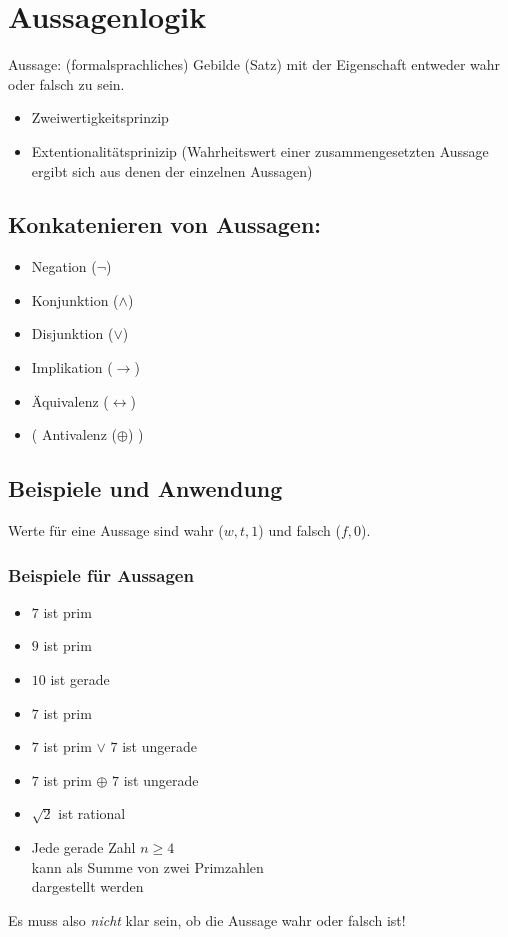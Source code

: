 %
\section{Aussagenlogik}
Aussage: (formalsprachliches) Gebilde (Satz) mit der Eigenschaft entweder wahr oder falsch zu sein.
%
\begin{itemize}
\item Zweiwertigkeitsprinzip
\item Extentionalitätsprinizip (Wahrheitswert einer zusammengesetzten Aussage ergibt sich aus denen der einzelnen Aussagen)
\end{itemize}
%
\subsection{Konkatenieren von Aussagen:}
\begin{itemize}
\item Negation (\( \neg \)) 
\item Konjunktion (\( \land \)) 
\item Disjunktion (\( \lor \)) 
\item Implikation (\( \rightarrow \)) 
\item Äquivalenz (\( \leftrightarrow \)) 
\item ( Antivalenz (\( \oplus \)) ) 
\end{itemize}
%
\subsection{Beispiele und Anwendung}
%
Werte für eine Aussage sind wahr (\( w,t,1 \)) und falsch (\( f,0 \)).
%
\subsubsection{Beispiele für Aussagen}
\begin{itemize}
\item \glqq $7$ ist prim\grqq{}
\item \glqq $9$ ist prim\grqq{}
\item \glqq $10$ ist gerade\grqq{}
\item \glqq $7$ ist prim\grqq{}
\item \glqq $7$ ist prim $\lor$ $7$ ist ungerade\grqq{}
\item \glqq $7$ ist prim $\oplus$ $7$ ist ungerade\grqq{}
\item \glqq $\sqrt{2}$ ist rational\grqq{}
\item \glqq Jede gerade Zahl $n\geq 4$\\
kann als Summe von zwei Primzahlen\\
dargestellt werden\grqq{}
\end{itemize}
%
Es muss also \emph{nicht} klar sein, ob die Aussage wahr oder falsch ist!
%
